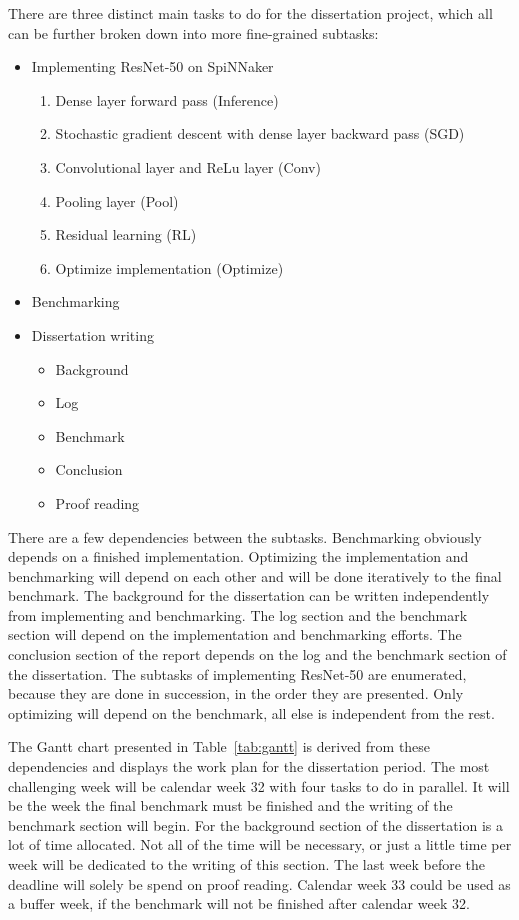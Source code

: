 \documentclass{article}
\begin{document}
There are three distinct main tasks to do for the
dissertation project, which all can be further broken
down into more fine-grained subtasks:
\begin{itemize}
  \item Implementing ResNet-50 on SpiNNaker
    \begin{enumerate}
      \item Dense layer forward pass (Inference)
        \citep[see][]{goodfellow2016}
      \item Stochastic gradient descent with dense layer
        backward pass (SGD) \citep[see][]{goodfellow2016}
      \item Convolutional layer and ReLu layer (Conv)
        \citep[see][]{goodfellow2016}
      \item Pooling layer (Pool)
        \citep[see][]{goodfellow2016}
      \item Residual learning (RL)
        \citep[see][]{he_et_al_2015}
      \item Optimize implementation (Optimize)
    \end{enumerate}
  \item Benchmarking
  \item Dissertation writing
    \begin{itemize}
      \item Background
      \item Log
      \item Benchmark
      \item Conclusion
      \item Proof reading
    \end{itemize}
\end{itemize}
There are a few dependencies between the subtasks.
Benchmarking obviously depends on a finished
implementation.
Optimizing the implementation and benchmarking will depend
on each other and will be done iteratively to the final
benchmark.
The background for the dissertation can be written
independently from implementing and benchmarking.
The log section and the benchmark section will depend on
the implementation and benchmarking efforts.
The conclusion section of the report depends on the log and
the benchmark section of the dissertation.
The subtasks of implementing ResNet-50 are enumerated,
because they are done in succession, in the order they
are presented.
Only optimizing will depend on the benchmark, all else is
independent from the rest.

The Gantt chart presented in Table~\ref{tab:gantt} is
derived from these dependencies and displays the work plan
for the dissertation period.
The most challenging week will be calendar week 32 with
four tasks to do in parallel.
It will be the week the final benchmark must be finished
and the writing of the benchmark section will begin.
For the background section of the dissertation is a lot of
time allocated.
Not all of the time will be necessary, or just a little
time per week will be dedicated to the writing of this
section.
The last week before the deadline will solely be spend on
proof reading.
Calendar week 33 could be used as a buffer week, if
the benchmark will not be finished after calendar week 32.
\end{document}
